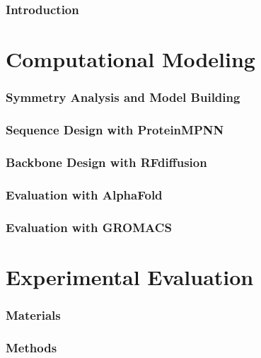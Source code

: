 \documentclass[12pt]{article}
\theoremstyle{definition}
\begin{document}
\tableofcontents
\clearpage

\section{Introduction}\label{ch:introduction}

\FloatBarrier

% 

\part{Computational Modeling}
\section{Symmetry Analysis and Model Building}\label{ch:symmetry}

\FloatBarrier

\section{Sequence Design with ProteinMPNN}\label{ch:pmpnn}

\FloatBarrier

\section{Backbone Design with RFdiffusion}\label{ch:rfdiffusion}

\FloatBarrier

\section{Evaluation with AlphaFold}\label{ch:alphafold}

\FloatBarrier

\section{Evaluation with GROMACS}\label{ch:gromacs}

\FloatBarrier

\part{Experimental Evaluation}
\section{Materials}\label{ch:materials}


\section{Methods}\label{ch:methods}


\clearpage



\clearpage
\printbibliography
\end{document}
